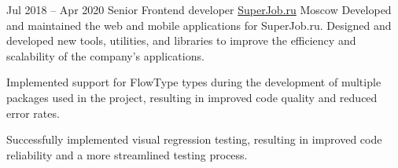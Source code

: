 \cventry
  {Jul 2018 – Apr 2020}
  {Senior Frontend developer}
  {\href{https://superjob.ru}{SuperJob.ru}}
  {Moscow}
  {}
  {Developed and maintained the web and mobile applications for SuperJob.ru. Designed and developed new tools, utilities, and libraries to improve the efficiency and scalability of the company's applications.}

\cvlistitem
  {Implemented support for FlowType types during the development of multiple packages used in the project, resulting in improved code quality and reduced error rates.}

\cvlistitem
  {Successfully implemented visual regression testing, resulting in improved code reliability and a more streamlined testing process.}
